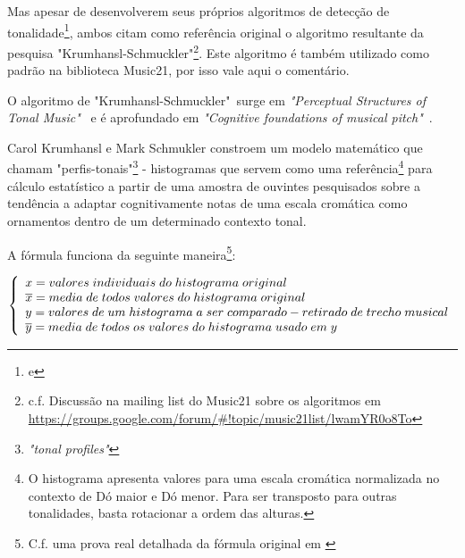 \documentclass[
	12pt,				%
	openright,			%
	twoside,			%
	a4paper,			%
	english,			%
	french,				%
	spanish,			%
	brazil				%
	]{abntex2}
\begin{document}
Mas apesar de desenvolverem seus próprios algoritmos de detecção de tonalidade\footnote{\cite[p. 173]{temperley2001cognition} e }, ambos citam como referência original o algoritmo resultante da pesquisa "Krumhansl-Schmuckler"\footnote{c.f. Discussão na mailing list do Music21 sobre os algoritmos em \url{https://groups.google.com/forum/\#!topic/music21list/lwamYR0o8To}}. Este algoritmo é também utilizado como padrão na biblioteca Music21, por isso vale aqui o comentário.

O algoritmo de "Krumhansl-Schmuckler"\ surge em \textit{"Perceptual Structures of Tonal Music"}\ \cite{krumhansl1983perceptual} e é aprofundado em \textit{"Cognitive foundations of musical pitch"}\ \cite{krumhansl1990cognitive}.

Carol Krumhansl e Mark Schmukler constroem um modelo matemático que chamam "perfis-tonais"\footnote{\textit{"tonal profiles"}} - histogramas que servem como uma referência\footnote{O histograma apresenta valores para uma escala cromática normalizada no contexto de Dó maior e Dó menor. Para ser transposto para outras tonalidades, basta rotacionar a ordem das alturas.} para cálculo estatístico a partir de uma amostra de ouvintes pesquisados sobre a tendência a adaptar cognitivamente \cite[p.  173]{temperley2001cognition} notas de uma escala cromática como ornamentos dentro de um determinado contexto tonal.

A fórmula funciona da seguinte maneira\footnote{C.f. uma prova real detalhada da fórmula original em \cite[p.37]{krumhansl1990cognitive} }:



$ \left\{
  \begin{array}{l l}
x = valores\;individuais\;do\;histograma\;original \\
\overline{x} = media\;de\;todos\;valores\;do\;histograma\;original \\
y = valores\;de\;um\;histograma\;a\;ser\;comparado - retirado\;de\;trecho\;musical \\
\overline{y} = media\;de\;todos\;os\;valores\;do\;histograma\;usado\;em\;y \\
    
  \end{array} \right.
$
\end{document}
